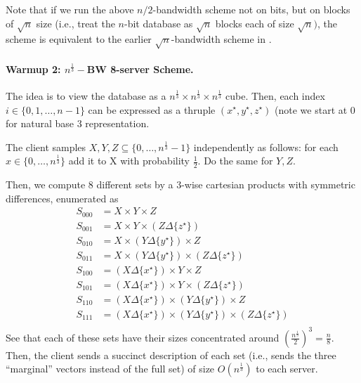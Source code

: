 \begin{remark}        
Note that if we run the above $n/2$-bandwidth scheme not on bits,
but on blocks of $\sqrt{n}$ size (i.e., treat
the $n$-bit database as $\sqrt{n}$ blocks each of size $\sqrt{n})$, 
the scheme is equivalent to the earlier $\sqrt{n}$-bandwidth scheme
in .
\end{remark}
	
\paragraph{Warmup 2: $n^{\frac 1 3}-$BW 8-server Scheme.}
	
		The idea is to view the database as a $n^{\frac 1 3} \times n^{\frac 1 3} \times n^{\frac 1 3}$ cube. Then, each index $i \in \{0,1,\dots,n - 1\}$ can be expressed as a thruple $(x^\star, y^\star, z^\star)$ (note we start at $0$ for natural base 3 representation.

		The client samples $X,Y,Z \subseteq \{0, \dots, n^{\frac{1}{3}} - 1\}$ independently as follows: for each $x \in \{0,\dots, n^{\frac{1}{3}}\}$ add it to X with probability $\frac 1 2$. Do the same for $Y,Z$.
	
		Then, we compute $8$ different sets by a 3-wise cartesian products with symmetric differences, enumerated as 
		\begin{align*}
			S_{000} &= X \times Y \times Z \\
			S_{001} &= X \times Y \times (Z \Delta \{z^\star\}) \\
			S_{010} &= X \times (Y \Delta \{y^{\star}\}) \times Z \\
			S_{011} &= X \times (Y \Delta \{y^{\star}\}) \times (Z \Delta \{z^\star\}) \\
			S_{100} &= (X \Delta \{x^{\star}\}) \times Y \times Z \\
			S_{101} &= (X \Delta \{x^{\star}\}) \times Y \times (Z \Delta \{z^\star\}) \\
			S_{110} &= (X \Delta \{x^{\star}\}) \times (Y \Delta \{y^{\star}\}) \times Z \\
			S_{111} &= (X \Delta \{x^{\star}\}) \times (Y \Delta \{y^{\star}\}) \times (Z \Delta \{z^\star\}) \\
		\end{align*}
		See that each of these sets have their sizes concentrated around $\left(\frac{n^{\frac 1 3}}{2}\right)^{3} = \frac n 8$. Then, the client sends a succinct description of each set (i.e., sends the three ``marginal'' vectors instead of the full set) of size $O(n^{\frac 1 3})$ to each server. 


